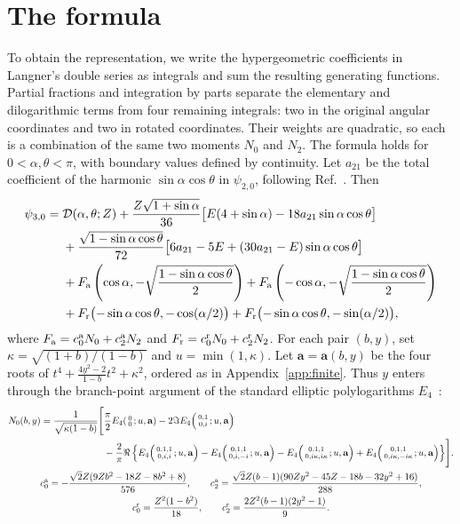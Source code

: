 \documentclass[10pt]{article}
\newcommand{\EF}[2]{E_4\!\left(\begin{smallmatrix}#1\\#2\end{smallmatrix};u,\mathbf a\right)}
\begin{document}
\section{The formula}
To obtain the representation, we write the hypergeometric coefficients in Langner's double series as integrals and sum the resulting generating functions.
Partial fractions and integration by parts separate the elementary and dilogarithmic terms from four remaining integrals: two in the original angular coordinates and two in rotated coordinates.
Their weights are quadratic, so each is a combination of the same two moments $N_0$ and $N_2$.
The formula holds for $0<\alpha,\theta<\pi$, with boundary values defined by continuity.
Let $a_{21}$ be the total coefficient of the harmonic $\sin\alpha\cos\theta$ in $\psi_{2,0}$, following Ref.~\cite{LK2024}.
Then
\begin{equation}\label{eq:answer}
\begin{aligned}
\psi_{3,0}={}&\mathcal D(\alpha,\theta;Z)
 +\frac{Z\sqrt{1+\sin\alpha}}{36}\bigl[E(4+\sin\alpha)-18a_{21}\sin\alpha\cos\theta\bigr]\\
 &+\frac{\sqrt{1-\sin\alpha\cos\theta}}{72}
 \bigl[6a_{21}-5E+(30a_{21}-E)\sin\alpha\cos\theta\bigr]\\
 &+F_{\rm a}\left(\cos\alpha,-\sqrt{\frac{1-\sin\alpha\cos\theta}{2}}\right)
 +F_{\rm a}\left(-\cos\alpha,-\sqrt{\frac{1-\sin\alpha\cos\theta}{2}}\right)\\
 &+F_{\rm r}\bigl(-\sin\alpha\cos\theta,-\cos(\alpha/2)\bigr)
 +F_{\rm r}\bigl(-\sin\alpha\cos\theta,-\sin(\alpha/2)\bigr),
\end{aligned}
\end{equation}
where $F_{\rm a}=c_0^{\rm a}N_0+c_2^{\rm a}N_2$ and $F_{\rm r}=c_0^{\rm r}N_0+c_2^{\rm r}N_2$.
For each pair $(b,y)$, set $\kappa=\sqrt{(1+b)/(1-b)}$ and $u=\min(1,\kappa)$.
Let $\mathbf a=\mathbf a(b,y)$ be the four roots of $t^4+\frac{4y^2-2}{1-b}t^2+\kappa^2$, ordered as in Appendix~\ref{app:finite}.
Thus $y$ enters through the branch-point argument of the standard elliptic polylogarithms $E_4$~\cite{BDDT}:
\begin{gather}
 \begin{aligned}
 N_0(b,y)=\frac{1}{\sqrt{\kappa(1-b)}}\Biggl[&\frac\pi2\EF{0}{0}
 -2\Im\EF{0,1}{0,i}\\
 &-\frac2\pi\Re\left\{\EF{0,1,1}{0,i,i}-\EF{0,1,1}{0,i,-i}
 -\EF{0,1,1}{0,i\kappa,i\kappa}+\EF{0,1,1}{0,i\kappa,-i\kappa}\right\}\Biggr].
 \end{aligned}\label{eq:moments}\\
 c_0^{\rm a}=-\frac{\sqrt2Z(9Zb^2-18Z-8b^2+8)}{576},\qquad
 c_2^{\rm a}=\frac{\sqrt2Z(b-1)(90Zy^2-45Z-18b-32y^2+16)}{288},\nonumber\\
 c_0^{\rm r}=\frac{Z^2(1-b^2)}{18},\qquad
 c_2^{\rm r}=\frac{2Z^2(b-1)(2y^2-1)}9.\nonumber
\end{gather}
\end{document}
